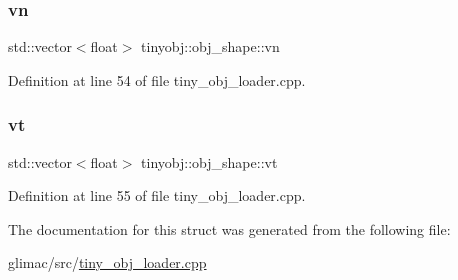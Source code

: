 \subsubsection{\texorpdfstring{vn}{vn}}
{\footnotesize\ttfamily std\+::vector$<$float$>$ tinyobj\+::obj\+\_\+shape\+::vn}



Definition at line 54 of file tiny\+\_\+obj\+\_\+loader.\+cpp.

\mbox{\label{structtinyobj_1_1obj__shape_a2d6dcc97e66ca2596dd50236c899b456}} 
\subsubsection{\texorpdfstring{vt}{vt}}
{\footnotesize\ttfamily std\+::vector$<$float$>$ tinyobj\+::obj\+\_\+shape\+::vt}



Definition at line 55 of file tiny\+\_\+obj\+\_\+loader.\+cpp.



The documentation for this struct was generated from the following file\+:\begin{DoxyCompactItemize}
\item 
glimac/src/\hyperlink{tiny__obj__loader_8cpp}{tiny\+\_\+obj\+\_\+loader.\+cpp}\end{DoxyCompactItemize}
